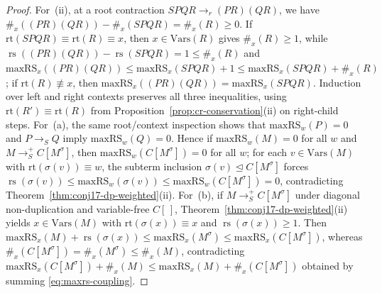 \documentclass[11pt,reqno]{amsart}
\numberwithin{equation}{section}
\theoremstyle{plain}
\theoremstyle{definition}
\theoremstyle{remark}
\DeclareMathOperator{\rs}{rs}
\newcommand{\redS}{\to_S}
\newcommand{\redSp}{\to_S^+}
\begin{document}
\begin{proof}
For~(ii), at a root contraction $S P Q R \to_r (P R)(Q R)$, we have $\#_x((P R)(Q R)) - \#_x(S P Q R) = \#_x(R) \ge 0$. If $\mathrm{rt}(S P Q R) \equiv \mathrm{rt}(R) \equiv x$, then $x \in \mathrm{Vars}(R)$ gives $\#_x(R) \ge 1$, while $\rs((P R)(Q R)) - \rs(S P Q R) = 1 \le \#_x(R)$ and $\mathrm{maxRS}_x((P R)(Q R)) \le \mathrm{maxRS}_x(S P Q R) + 1 \le \mathrm{maxRS}_x(S P Q R) + \#_x(R)$; if $\mathrm{rt}(R) \not\equiv x$, then $\mathrm{maxRS}_x((P R)(Q R)) = \mathrm{maxRS}_x(S P Q R)$. Induction over left and right contexts preserves all three inequalities, using $\mathrm{rt}(R') \equiv \mathrm{rt}(R)$ from Proposition~\ref{prop:cr-conservation}(ii) on right-child steps. For~(a), the same root/context inspection shows that $\mathrm{maxRS}_w(P) = 0$ and $P \redS Q$ imply $\mathrm{maxRS}_w(Q) = 0$. Hence if $\mathrm{maxRS}_w(M) = 0$ for all $w$ and $M \redSp C[M^\sigma]$, then $\mathrm{maxRS}_w(C[M^\sigma]) = 0$ for all $w$; for each $v \in \mathrm{Vars}(M)$ with $\mathrm{rt}(\sigma(v)) \equiv w$, the subterm inclusion $\sigma(v) \trianglelefteq C[M^\sigma]$ forces $\rs(\sigma(v)) \le \mathrm{maxRS}_w(\sigma(v)) \le \mathrm{maxRS}_w(C[M^\sigma]) = 0$, contradicting Theorem~\ref{thm:conj17-dp-weighted}(ii). For~(b), if $M \redSp C[M^\sigma]$ under diagonal non-duplication and variable-free $C[\,]$, Theorem~\ref{thm:conj17-dp-weighted}(ii) yields $x \in \mathrm{Vars}(M)$ with $\mathrm{rt}(\sigma(x)) \equiv x$ and $\rs(\sigma(x)) \ge 1$. Then $\mathrm{maxRS}_x(M) + \rs(\sigma(x)) \le \mathrm{maxRS}_x(M^\sigma) \le \mathrm{maxRS}_x(C[M^\sigma])$, whereas $\#_x(C[M^\sigma]) = \#_x(M^\sigma) \le \#_x(M)$, contradicting $\mathrm{maxRS}_x(C[M^\sigma]) + \#_x(M) \le \mathrm{maxRS}_x(M) + \#_x(C[M^\sigma])$ obtained by summing \eqref{eq:maxrs-coupling}.


\end{proof}
\end{document}
